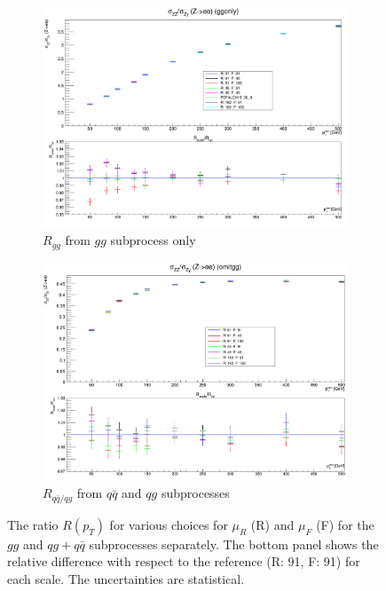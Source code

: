 \documentclass[11pt,a4paper,final]{report}
\begin{document}
\begin{figure}[H]
\centering
	\begin{subfigure}{0.49\textwidth}
		\includegraphics[width=\linewidth]{scale/ggonly_nlo_scale_overlay.png}
		\caption{$R_{gg}$ from $gg$ subprocess only}
	\end{subfigure}
	\begin{subfigure}{0.49\textwidth}
		\includegraphics[width=\linewidth]{scale/omitgg_nlo_scale_overlay.png}
		\caption{$R_{q\bar{q}/qg}$ from $q\bar{q}$ and $qg$ subprocesses}
	\end{subfigure}	
\caption{The ratio $R(p_T)$ for various choices for $\mu_R$ (R) and $\mu_F$ (F) for the $gg$ and $qg+q\bar{q}$ subprocesses separately. The bottom panel shows the relative difference with respect to the reference (R: 91, F: 91) for each scale. The uncertainties are statistical.}
\label{fig:gg_scale}
\end{figure}
\end{document}
